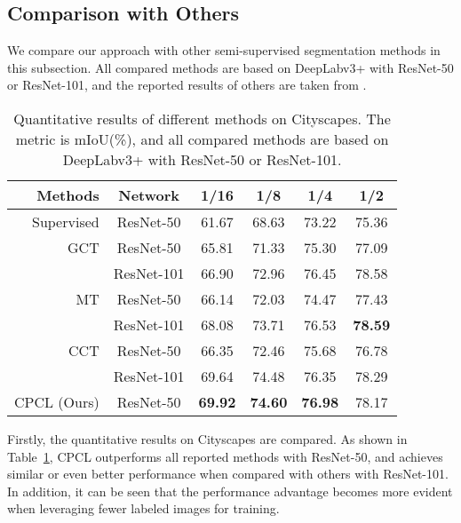\documentclass[journal]{IEEEtran}
\begin{document}
\subsection{Comparison with Others}

We compare our approach with other semi-supervised segmentation methods in this subsection. All compared methods are based on DeepLabv3+ with ResNet-50 or ResNet-101, and the 
reported results of others are taken from \cite{CPS}.

\begin{table}[ht]
  \footnotesize
  \caption{Quantitative results of different methods on Cityscapes. The metric is mIoU(\%), and all compared methods are based on DeepLabv3+ with ResNet-50 or ResNet-101.}
  \begin{center}
  \renewcommand{\arraystretch}{1.3}
  \begin{tabular}{rccccc} 
  \hline
    Methods           & Network      & 1/16        & 1/8        & 1/4         & 1/2  \\ \hline
    Supervised        & ResNet-50    & 61.67       & 68.63      & 73.22       & 75.36      \\
    GCT \cite{GCT}    & ResNet-50    & 65.81       & 71.33      & 75.30       & 77.09      \\
                      & ResNet-101   & 66.90       & 72.96      & 76.45       & 78.58      \\
    MT \cite{MT}      & ResNet-50    & 66.14       & 72.03      & 74.47       & 77.43      \\
                      & ResNet-101   & 68.08       & 73.71      & 76.53       & \bf 78.59      \\      
    CCT \cite{CCT}    & ResNet-50    & 66.35       & 72.46      & 75.68       & 76.78      \\ 
                      & ResNet-101   & 69.64       & 74.48      & 76.35       & 78.29      \\ \hline
    CPCL (Ours)       & ResNet-50    & \bf 69.92   & \bf 74.60  & \bf 76.98   & 78.17      \\ \hline
   
  \end{tabular}
  \end{center}
  \label{tab:cs_sota}
\end{table}

Firstly, the quantitative results on Cityscapes are compared. As shown in Table~\ref{tab:cs_sota}, CPCL outperforms all reported methods with ResNet-50, and achieves similar 
or even better performance when compared with others with ResNet-101. In addition, it can be seen that the performance advantage becomes more evident when leveraging 
fewer labeled images for training.
\end{document}
